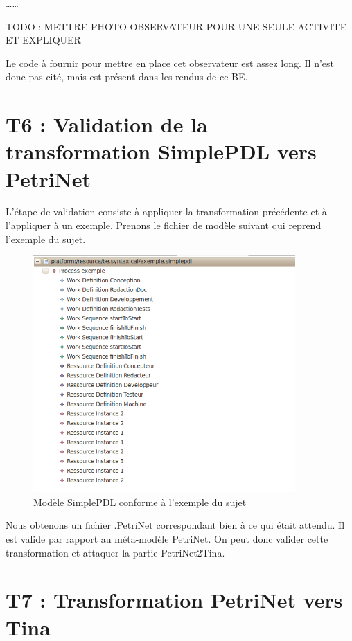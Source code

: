 \documentclass{report}
\begin{document}
\ldots \ldots 

TODO : METTRE PHOTO OBSERVATEUR POUR UNE SEULE ACTIVITE ET EXPLIQUER

Le code à fournir pour mettre en place cet observateur est assez long. Il n'est donc pas cité, mais est présent dans les rendus de ce BE.

\newpage

\section{T6 : Validation de la transformation SimplePDL vers PetriNet}

L'étape de validation consiste à appliquer la transformation précédente et à l'appliquer à un exemple. Prenons le fichier de modèle suivant qui reprend l'exemple du sujet.

\begin{figure}[!h] 
\begin{center}
\includegraphics[width=10cm]{Capture-7.png}
\caption{Modèle SimplePDL conforme à l'exemple du sujet} 
\label{img1} 
\end{center}
\end{figure} 

Nous obtenons un fichier .PetriNet correspondant bien à ce qui était attendu. Il est valide par rapport au méta-modèle PetriNet.
On peut donc valider cette transformation et attaquer la partie PetriNet2Tina.

\section{T7 : Transformation PetriNet vers Tina}
\end{document}
